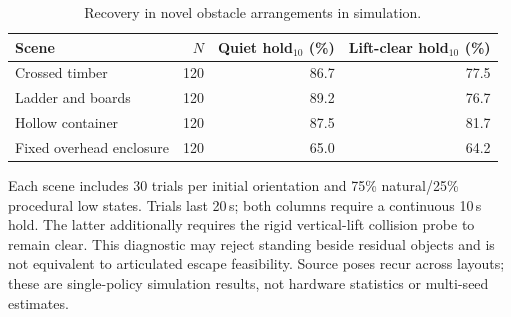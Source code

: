 \begin{table}[t]
\centering\footnotesize
\caption{Recovery in novel obstacle arrangements in simulation.}
\label{tab:scene_generalization}
\begin{tabular}{lrrr}
\toprule
Scene & $N$ & Quiet hold$_{10}$ (\%) & Lift-clear hold$_{10}$ (\%)\\
\midrule
Crossed timber & 120 & 86.7 & 77.5\\
Ladder and boards & 120 & 89.2 & 76.7\\
Hollow container & 120 & 87.5 & 81.7\\
\midrule
Fixed overhead enclosure & 120 & 65.0 & 64.2\\
\bottomrule
\end{tabular}
\par\vspace{2pt}
\begin{minipage}{.98\columnwidth}\scriptsize
Each scene includes 30 trials per initial orientation and 75\% natural/25\% procedural low states. Trials last 20\,s; both columns require a continuous 10\,s hold. The latter additionally requires the rigid vertical-lift collision probe to remain clear. This diagnostic may reject standing beside residual objects and is not equivalent to articulated escape feasibility. Source poses recur across layouts; these are single-policy simulation results, not hardware statistics or multi-seed estimates.
\end{minipage}
\end{table}
